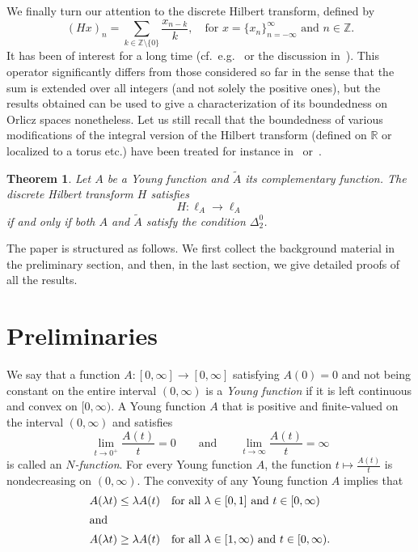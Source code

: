 \documentclass[nointlimits]{amsart}
\numberwithin{equation}{section}
\theoremstyle{plain}
\newtheorem{theorem}{Theorem}[section]
\theoremstyle{definition}
\newcommand{\R}{\mathbb{R}}
\newcommand{\DTwo}{\Delta_2}
\newcommand{\DTwoZ}{\DTwo^0}
\newcommand{\tA}{\tilde{A}}
\begin{document}
We finally turn our attention to the discrete Hilbert transform, defined by
    \begin{equation*}
        (Hx)_n = \sum_{k\in\mathbb Z\setminus\{0\}}
        \frac{x_{n-k}}{k},
        \quad\text{for $x=\{x_n\}_{n = -\infty}^\infty$ and $n\in\mathbb Z$.}
    \end{equation*}
It has been of interest for a long time (cf.~e.g.~\cite[Chapter IX]{Har:88} or the discussion in~\cite[page~19]{Ben:80}). This operator significantly differs from those considered so far in the sense that the sum is extended over all integers (and not solely the positive ones), but the results obtained can be used to give a characterization of its boundedness on Orlicz spaces nonetheless. Let us still recall that the boundedness of various modifications of the integral version of the Hilbert transform (defined on $\R$ or localized to a torus etc.) have been treated for instance in~\cite{Rya:63} or~\cite{Boy:67}.

\begin{theorem}
    \label{T:hilbert}
    Let $A$ be a Young function and $\tA$ its complementary function. The discrete Hilbert transform $H$ satisfies 
    \begin{equation}\label{E:h-on-orlicz}
        H\colon \ell_A\to\ell_A
    \end{equation}
    if and only if both $A$ and $\tA$ satisfy the condition $\DTwoZ$.
\end{theorem}

The paper is structured as follows. We first collect the background material in the preliminary section, and then, in the last section, we give detailed proofs of all the results.
    
\section{Preliminaries}\label{sec:prel}

We say that a function $A\colon[0,\infty]\to[0,\infty]$ satisfying
$A(0)=0$ and not being constant on the entire interval $(0,\infty)$ is a \emph{Young
function} if it is left continuous and convex on $[0,\infty)$. A Young function $A$ that is positive and finite-valued on the interval $(0, \infty)$ and satisfies
\begin{equation*}
    \lim_{t\to0^+}\frac{A(t)}{t} = 0 \qquad \text{and} \qquad \lim_{t\to\infty}\frac{A(t)}{t} = \infty
\end{equation*}
is called an \emph{$N$-function}. For every Young function $A$, the function $t\mapsto \frac{A(t)}{t}$ is nondecreasing on $(0,\infty)$. The convexity of any Young function $A$ implies that
\begin{align}
    A(\lambda t) &\leq \lambda A(t) \quad \text{for all $\lambda\in[0,1]$ and $t\in[0, \infty)$} \label{prel:convexity_small_lambda}\\
    \intertext{and}
    A(\lambda t) &\geq \lambda A(t) \quad \text{for all $\lambda\in[1, \infty)$ and $t\in[0, \infty)$}. \nonumber
\end{align}
\end{document}
